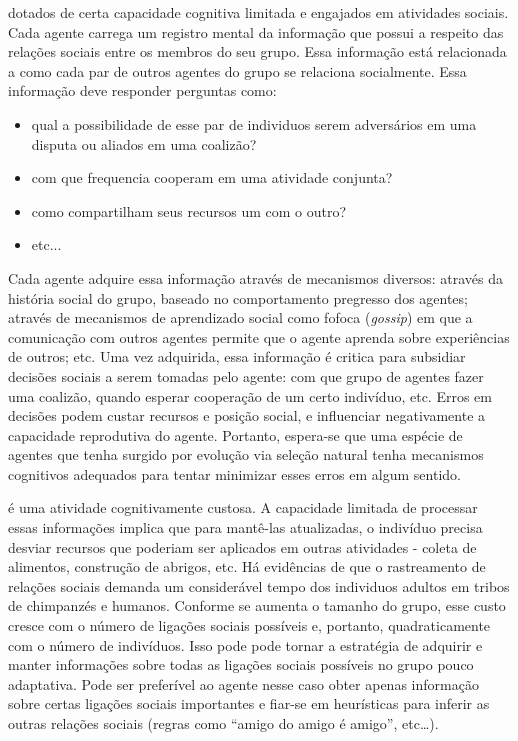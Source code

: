  dotados de certa capacidade cognitiva limitada e engajados em atividades sociais. Cada agente carrega um registro mental da informação que possui a respeito das relações sociais entre os membros do seu grupo. Essa informação está relacionada a como cada par de outros agentes do grupo se relaciona socialmente. Essa informação deve responder perguntas como: 
\begin{itemize}
 \item qual a possibilidade de esse par de individuos serem adversários em uma disputa ou aliados em uma coalizão?
 \item com que frequencia cooperam em uma atividade conjunta?
 \item como compartilham seus recursos um com o outro?
 \item etc...
\end{itemize}  
Cada agente adquire essa informação através de mecanismos diversos: através da história social do grupo, baseado no comportamento pregresso dos agentes; através de mecanismos de aprendizado social como fofoca (\textit{gossip}) em que a comunicação com outros agentes permite que o agente aprenda sobre experiências de outros; etc. Uma vez adquirida, essa informação é critica para subsidiar decisões sociais a serem tomadas pelo agente: com que grupo de agentes fazer uma coalizão, quando esperar cooperação de um certo indivíduo, etc. Erros em decisões podem custar recursos e posição social, e influenciar negativamente a capacidade reprodutiva do agente. Portanto, espera-se que uma espécie de agentes que tenha surgido por evolução via seleção natural tenha mecanismos cognitivos adequados para tentar minimizar esses erros em algum sentido. 

 é uma atividade cognitivamente custosa. A capacidade limitada de processar essas informações implica que para mantê-las atualizadas, o indivíduo precisa desviar recursos 
que poderiam ser aplicados em outras atividades - coleta de alimentos, construção de abrigos, etc. Há evidências \cite[-5em]{deWaal2007,deWaal1990} \sourcesneeded de que o rastreamento de relações sociais demanda um considerável tempo dos individuos adultos em tribos de chimpanzés e humanos. Conforme se aumenta o tamanho do grupo, esse custo cresce com o número de ligações sociais possíveis e, portanto, quadraticamente com o número de indivíduos. Isso pode pode tornar a estratégia de adquirir e manter informações sobre todas as ligações sociais possíveis no grupo pouco adaptativa. Pode ser preferível ao agente nesse caso obter apenas informação sobre certas ligações sociais importantes e fiar-se em heurísticas para inferir as outras relações sociais (regras como ``amigo do amigo é amigo'', etc\ldots{}).

